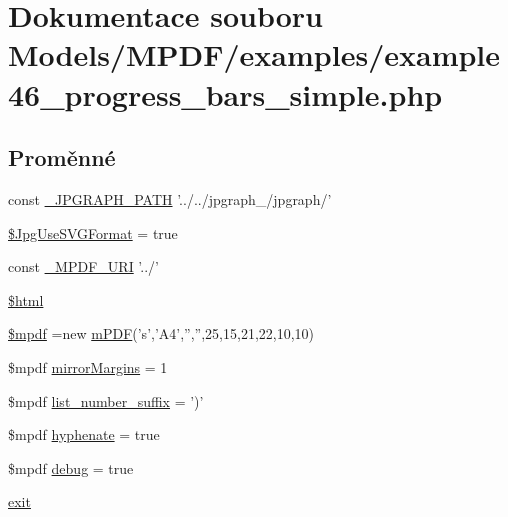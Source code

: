 \hypertarget{example46__progress__bars__simple_8php}{\section{Dokumentace souboru Models/\-M\-P\-D\-F/examples/example46\-\_\-progress\-\_\-bars\-\_\-simple.php}
\label{example46__progress__bars__simple_8php}
}
\subsection*{Proměnné}
\begin{DoxyCompactItemize}
\item 
const \hyperlink{example46__progress__bars__simple_8php_aa256b12517ab22b9550c150865a689c4}{\-\_\-\-J\-P\-G\-R\-A\-P\-H\-\_\-\-P\-A\-T\-H} '../../jpgraph\-\_/jpgraph/'
\item 
\hyperlink{example46__progress__bars__simple_8php_a4767d5ef05aa1f95f7a64c0aa8f26ccc}{\$\-Jpg\-Use\-S\-V\-G\-Format} = true
\item 
const \hyperlink{example46__progress__bars__simple_8php_a1ff50e3d84f8270d034f2e9d99c147c0}{\-\_\-\-M\-P\-D\-F\-\_\-\-U\-R\-I} '../'
\item 
\hyperlink{example46__progress__bars__simple_8php_a6f96e7fc92441776c9d1cd3386663b40}{\$html}
\item 
\hyperlink{example46__progress__bars__simple_8php_ad028f81910d6cbab9b184d2214b3a8f8}{\$mpdf} =new \hyperlink{classm_p_d_f}{m\-P\-D\-F}('s','A4','','',25,15,21,22,10,10)
\item 
\$mpdf \hyperlink{example46__progress__bars__simple_8php_a24c284cb7774410f65953584ea1fd9c1}{mirror\-Margins} = 1
\item 
\$mpdf \hyperlink{example46__progress__bars__simple_8php_a0e143fd6cd1ed977446f3abf05380031}{list\-\_\-number\-\_\-suffix} = ')'
\item 
\$mpdf \hyperlink{example46__progress__bars__simple_8php_a988e0360138a1001f27d70c65256d100}{hyphenate} = true
\item 
\$mpdf \hyperlink{example46__progress__bars__simple_8php_a200a436f1833a712239f1ae5bec608db}{debug} = true
\item 
\hyperlink{example46__progress__bars__simple_8php_a6733eb5f605d09eaede9845835d71c4e}{exit}
\end{DoxyCompactItemize}


